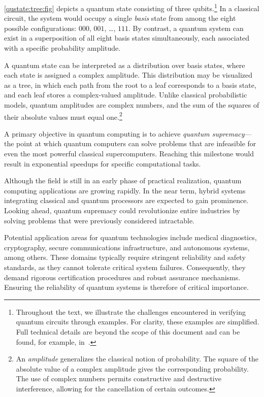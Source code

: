 \cref{qustate:tree:fig} depicts a quantum state consisting of three qubits.\footnote{Throughout the text, we illustrate the challenges encountered in verifying quantum circuits through examples. %
For clarity, these examples are simplified. Full technical details are beyond the scope of this document and can be found, for example, in~\cite{10.5555/1408782}.} In a classical circuit, the system would occupy a single \emph{basis} state from among the eight possible configurations: $000$, $001$, \ldots, $111$. %
By contrast, a quantum system can exist in a superposition of all eight basis states simultaneously, each associated with a specific probability amplitude.

A quantum state can be interpreted as a distribution over basis states, where each state is assigned a complex amplitude. This distribution may be visualized as a tree, in which each path from the root to a leaf corresponds to a basis state, and each leaf stores a complex-valued amplitude. %
Unlike classical probabilistic models, quantum amplitudes are complex numbers, and the sum of the squares of their absolute values must equal one.\footnote{An \emph{amplitude} generalizes the classical notion of probability. The square of the absolute value of a complex amplitude gives the corresponding probability. The use of complex numbers permits constructive and destructive interference, allowing for the cancellation of certain outcomes.} %

A primary objective in quantum computing is to achieve \emph{quantum supremacy}—the point at which quantum computers can solve problems that are infeasible for even the most powerful classical supercomputers. %
Reaching this milestone would result in exponential speedups for specific computational tasks. %

Although the field is still in an early phase of practical realization, quantum computing applications are growing rapidly. %
In the near term, hybrid systems integrating classical and quantum processors are expected to gain prominence. Looking ahead, quantum supremacy could revolutionize entire industries by solving problems that were previously considered intractable. %

Potential application areas for quantum technologies include medical diagnostics, cryptography, secure communications infrastructure, and autonomous systems, among others. %
These domains typically require stringent reliability and safety standards, as they cannot tolerate critical system failures. Consequently, they demand rigorous certification procedures and robust assurance mechanisms. Ensuring the reliability of quantum systems is therefore of critical importance. %

